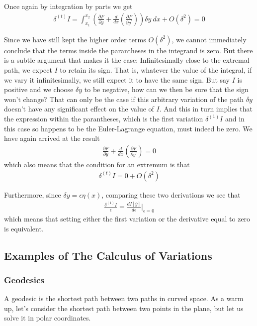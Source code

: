 \documentclass[a4paper]{article}
\begin{document}
    Once again by integration by parts we get \begin{align*}
        \delta^{(t)} I = \int_{x_1}^{x_2} \left( \frac{\partial F}{\partial y} + \frac{d}{dx}\left(\frac{\partial F}{\partial y^{\prime} }\right)\right)\delta y\ dx + O(\delta^2) = 0 
    \end{align*}

    Since we have still kept the higher order terms \(O(\delta^{2})\), we cannot immediately conclude that the terms inside the parantheses in the integrand is zero. But there is a subtle argument that makes it the case: Infinitesimally close to the extremal path, we expect \(I\) to retain its sign. That is, whatever the value of the integral, if we vary it infinitesimally, we still expect it to have the same sign. But say \(I\) is positive and we choose \(\delta y\) to be negative, how can we then be sure that the sign won't change? That can only be the case if this arbitrary variation of the path \(\delta y\) doesn't have any significant effect on the value of \(I\). And this in turn implies that the expression within the parantheses, which is the first variation \(\delta ^{(1)}I\) and in this case so happens to be the Euler-Lagrange equation, must indeed be zero. We have again arrived at the result \begin{align*}
        \frac{\partial F}{\partial y} + \frac{d}{dx}\left( \frac{\partial F}{\partial y^{\prime} }  \right) = 0
    \end{align*}
    which also means that the condition for an extremum is that \begin{align*}
        \delta^{(t)} I = 0 + O(\delta ^{2} )
    \end{align*}

    Furthermore, since \(\delta y = \epsilon \eta(x)\), comparing these two derivations we see that \begin{align*}
        \frac{\delta ^{(1)} I}{\epsilon} = \frac{dI[\overline{y}]}{d\epsilon }\biggr|_{\epsilon = 0} 
    \end{align*}
    which means that setting either the first variation or the derivative equal to zero is equivalent.

    \subsection{Examples of The Calculus of Variations}
    \subsubsection{Geodesics}
    A geodesic is the shortest path between two paths in curved space. As a warm up, let's consider the shortest path between two points in the plane, but let us solve it in polar coordinates.
\end{document}
